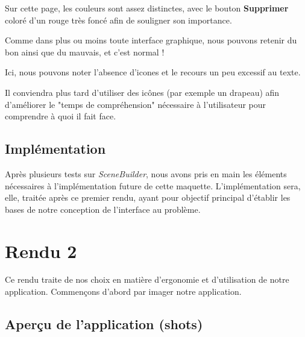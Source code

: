 \documentclass{mytex}
\begin{document}
Sur cette page, les couleurs sont assez distinctes, avec le bouton \textbf{Supprimer} coloré d'un rouge très foncé afin de souligner son importance.



Comme dans plus ou moins toute interface graphique, nous pouvons retenir du bon ainsi que du mauvais, et c'est normal !

Ici, nous pouvons noter l'absence d'icones et le recours un peu excessif au texte.

Il conviendra plus tard d'utiliser des icônes (par exemple un drapeau) afin d'améliorer le "temps de compréhension" nécessaire à l'utilisateur pour comprendre à quoi il fait face.

\subsection{Implémentation}

Après plusieurs tests sur \textit{SceneBuilder}, nous avons pris en main les éléments nécessaires à l'implémentation future de cette maquette. L'implémentation sera, elle, traitée après ce premier rendu, ayant pour objectif principal d'établir les bases de notre conception de l'interface au problème.

\section{Rendu 2}

Ce rendu traite de nos choix en matière d'ergonomie et d'utilisation de notre application. Commençons d'abord par imager notre application.

\subsection{Aperçu de l'application (shots)}




\end{document}
